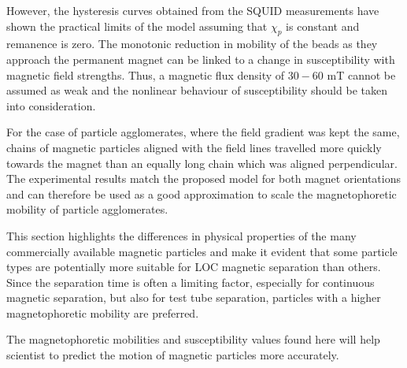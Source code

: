 However, the hysteresis curves obtained from the SQUID measurements have shown the practical limits of the model assuming that $\chi_{p}$ is constant and remanence is zero.  The monotonic reduction in mobility of the beads as they approach the permanent magnet can be linked to a change in susceptibility with magnetic field strengths. Thus, a magnetic flux density of $30-60$ mT cannot be assumed as weak and the nonlinear behaviour of susceptibility should be taken into consideration.

For the case of particle agglomerates, where the field gradient was kept the same, chains of magnetic particles aligned with the field lines travelled more quickly towards the magnet than an equally long chain which was aligned perpendicular. The experimental results match the proposed model for both magnet orientations and can therefore be used as a good approximation to scale the magnetophoretic mobility of particle agglomerates. 

This section highlights the differences in physical properties of the many commercially available magnetic particles and make it evident that some particle types are potentially more suitable for LOC magnetic separation than others. Since the separation time is often a limiting factor, especially for continuous magnetic separation, but also for test tube separation, particles with a higher magnetophoretic mobility are preferred. 

The magnetophoretic mobilities and susceptibility values found here will help scientist to predict the motion of magnetic particles more accurately.

